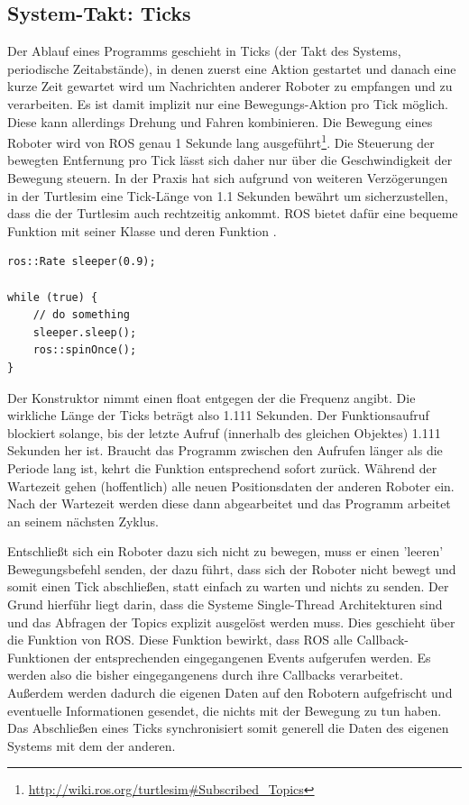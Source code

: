 \subsection*{System-Takt: Ticks}\label{subsec:Tick}

Der Ablauf eines Programms geschieht in Ticks (der Takt des Systems, periodische Zeitabstände), in denen zuerst eine Aktion gestartet und danach eine kurze Zeit gewartet wird um Nachrichten anderer Roboter zu empfangen und zu verarbeiten. Es ist damit implizit nur eine Bewegungs-Aktion pro Tick möglich. Diese kann allerdings Drehung und Fahren kombinieren.
Die Bewegung eines Roboter wird von \ac{ROS} genau 1 Sekunde lang ausgeführt\footnote{\url{http://wiki.ros.org/turtlesim\#Subscribed_Topics}}. Die Steuerung der bewegten Entfernung pro Tick lässt sich daher nur über die Geschwindigkeit der Bewegung steuern. In der Praxis hat sich aufgrund von weiteren Verzögerungen in der Turtlesim eine Tick-Länge von 1.1 Sekunden bewährt um sicherzustellen, dass die  der Turtlesim auch rechtzeitig ankommt. \ac{ROS} bietet dafür eine bequeme Funktion mit seiner Klasse  und deren Funktion .

\begin{lstlisting}[style=cpp, title=Ticks abschließen mit ROS Funktionen]
ros::Rate sleeper(0.9);
        
while (true) {
	// do something
	sleeper.sleep();
	ros::spinOnce();
}
\end{lstlisting}

Der Konstruktor nimmt einen float entgegen der die Frequenz angibt. Die wirkliche Länge der Ticks beträgt also 1.111 Sekunden. Der Funktionsaufruf  blockiert solange, bis der letzte Aufruf (innerhalb des gleichen Objektes) 1.111 Sekunden her ist. Braucht das Programm zwischen den Aufrufen länger als die Periode lang ist, kehrt die Funktion entsprechend sofort zurück.
Während der Wartezeit gehen (hoffentlich) alle neuen Positionsdaten der anderen Roboter ein. Nach der Wartezeit werden diese dann abgearbeitet und das Programm arbeitet an seinem nächsten Zyklus.

Entschließt sich ein Roboter dazu sich nicht zu bewegen, muss er einen 'leeren' Bewegungsbefehl senden, der dazu führt, dass sich der Roboter nicht bewegt und somit einen Tick abschließen, statt einfach zu warten und nichts zu senden. Der Grund hierführ liegt darin, dass die Systeme Single-Thread Architekturen sind und das Abfragen der Topics explizit ausgelöst werden muss. Dies geschieht über die Funktion  von \ac{ROS}. Diese Funktion bewirkt, dass \ac{ROS} alle Callback-Funktionen der entsprechenden eingegangenen Events aufgerufen werden. Es werden also die bisher eingegangenens durch ihre Callbacks verarbeitet. Außerdem werden dadurch die eigenen Daten auf den Robotern aufgefrischt und eventuelle Informationen gesendet, die nichts mit der Bewegung zu tun haben. Das Abschließen eines Ticks synchronisiert somit generell die Daten des eigenen Systems mit dem der anderen.

